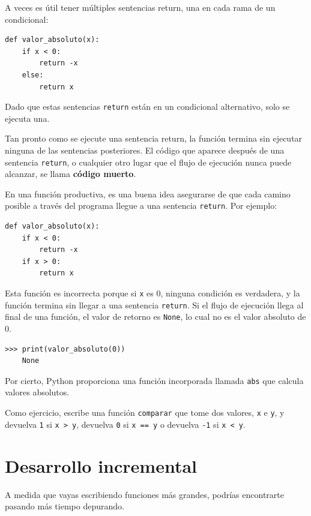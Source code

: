 \documentclass[10pt]{book}
\begin{document}
A veces es útil tener múltiples sentencias return, una en cada
rama de un condicional:

\begin{verbatim}
def valor_absoluto(x):
    if x < 0:
        return -x
    else:
        return x
\end{verbatim}
%
Dado que estas sentencias {\tt return} están en un condicional alternativo,
solo se ejecuta una.

Tan pronto como se ejecute una sentencia return, la función
termina sin ejecutar ninguna de las sentencias posteriores.
El código que aparece después de una sentencia {\tt return}, o cualquier otro lugar
que el flujo de ejecución nunca puede alcanzar, se llama
{\bf código muerto}.

En una función productiva, es una buena idea asegurarse de
que cada camino posible a través del programa llegue a una
sentencia {\tt return}.  Por ejemplo:

\begin{verbatim}
def valor_absoluto(x):
    if x < 0:
        return -x
    if x > 0:
        return x
\end{verbatim}
%
Esta función es incorrecta porque si {\tt x} es 0,
ninguna condición es verdadera, y la función termina sin llegar a una
sentencia {\tt return}.  Si el flujo de ejecución llega al final
de una función, el valor de retorno es {\tt None}, lo cual no es
el valor absoluto de 0.

\begin{verbatim}
>>> print(valor_absoluto(0))
    None
\end{verbatim}
%
Por cierto, Python proporciona una función incorporada llamada
{\tt abs} que calcula valores absolutos.

Como ejercicio, escribe una función {\tt comparar} que
tome dos valores, {\tt x} e {\tt y}, y devuelva {\tt 1} si {\tt x > y},
devuelva {\tt 0} si {\tt x == y} o devuelva {\tt -1} si {\tt x < y}.


\section{Desarrollo incremental}
\label{incremental.development}

A medida que vayas escribiendo funciones más grandes, podrías encontrarte
pasando más tiempo depurando.
\end{document}
